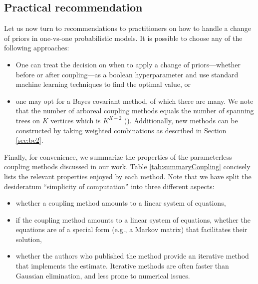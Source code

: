 \subsection{Practical recommendation}

Let us now turn to recommendations to practitioners on how to handle a change of priors in one-vs-one probabilistic models. It is possible to choose any of the following approaches:

\begin{itemize}
\item[1.] One can treat the decision on when to apply a change of priors---whether 
before or after coupling---as a boolean hyperparameter and use standard machine 
learning techniques to find the optimal value, or 
\item[2.] one may opt for a Bayes covariant method, of which there are many. 
We note that the number of arboreal coupling methods equals the number 
of spanning trees on $K$ vertices which is $K^{K-2}$ (\cite{cayley1878theorem}). 
Additionally, new methods can be constructed by taking weighted combinations 
as described in Section \ref{sec:bc2}.
\end{itemize}

Finally, for convenience, we summarize the properties of the parameterless coupling methods discussed in our work.  Table \ref{tab:summaryCoupling} concisely lists the relevant properties enjoyed by each method. Note that we have split the desideratum ``simplicity of computation'' into three different aspects:
\begin{itemize}
	\item whether a coupling method amounts to a linear system of equations,
	\item if the coupling method amounts to a linear system of equations, whether the equations are of a special form (e.g., a Markov matrix) that facilitates their solution,
	\item whether the authors who published the method provide an iterative method that implements the estimate. Iterative methods are often  faster than Gaussian elimination, and less prone to numerical issues.
\end{itemize}




